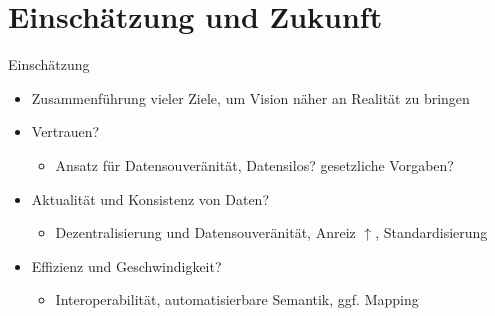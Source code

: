 
\section{Einschätzung und Zukunft}

\begin{frame}{Einschätzung}
    \begin{itemize}
        \item Zusammenführung vieler Ziele, um Vision näher an Realität zu bringen
        
        \pause
        \item Vertrauen?
        \pause
        \begin{itemize}
            \item Ansatz für Datensouveränität, Datensilos? gesetzliche Vorgaben?
        \end{itemize}

        \pause
        \item Aktualität und Konsistenz von Daten?
        \pause
        \begin{itemize}
            \item Dezentralisierung und Datensouveränität, Anreiz $\uparrow$, Standardisierung
        \end{itemize}

        \pause
        \item Effizienz und Geschwindigkeit?
        \pause
        \begin{itemize}
            \item Interoperabilität, automatisierbare Semantik, ggf. Mapping
        \end{itemize}


\end{itemize}
\end{frame}

